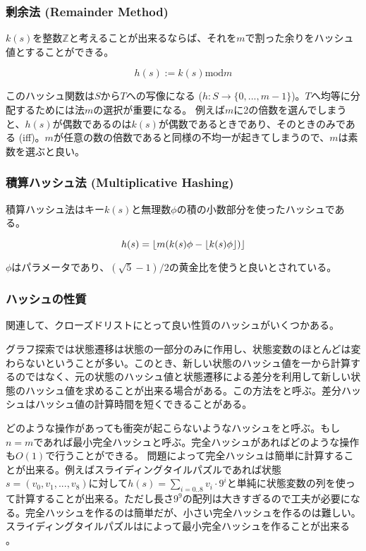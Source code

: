 \subsubsection{剰余法 (Remainder Method)}

$k(s)$を整数$\mathbb{Z}$と考えることが出来るならば、それを$m$で割った余りをハッシュ値とすることができる。

\begin{equation}
  h(s) := k(s) \text{mod} m
\end{equation}
  
このハッシュ関数は$S$から$T$への写像になる ($h: S \rightarrow \{0, ..., m-1\}$)。$T$へ均等に分配するためには法$m$の選択が重要になる。
例えば$m$に2の倍数を選んでしまうと、$h(s)$が偶数であるのは$k(s)$が偶数であるときであり、そのときのみである (iff)。$m$が任意の数の倍数であると同様の不均一が起きてしまうので、$m$は素数を選ぶと良い。


\subsubsection{積算ハッシュ法 (Multiplicative Hashing)}
積算ハッシュ法はキー$k(s)$と無理数$\phi$の積の小数部分を使ったハッシュである。

\begin{equation}
	h(s) = \lfloor m (k(s) \phi - \lfloor k(s) \phi\rfloor)\rfloor
\end{equation}

$\phi$はパラメータであり、$(\sqrt{5} - 1) / 2$の黄金比を使うと良いとされている。

\subsubsection{ハッシュの性質}

関連して、クローズドリストにとって良い性質のハッシュがいくつかある。

グラフ探索では状態遷移は状態の一部分のみに作用し、状態変数のほとんどは変わらないということが多い。このとき、新しい状態のハッシュ値を一から計算するのではなく、元の状態のハッシュ値と状態遷移による差分を利用して新しい状態のハッシュ値を求めることが出来る場合がある。この方法をと呼ぶ。差分ハッシュはハッシュ値の計算時間を短くできることがある。

どのような操作があっても衝突が起こらないようなハッシュをと呼ぶ。もし$n = m$であれば最小完全ハッシュと呼ぶ。完全ハッシュがあればどのような操作も$O(1)$で行うことができる。
問題によって完全ハッシュは簡単に計算することが出来る。例えばスライディングタイルパズルであれば状態$s = (v_0, v_1,...,v_8)$に対して$h(s) = \sum_{i = 0..8} v_i \cdot 9^i$と単純に状態変数の列を使って計算することが出来る。ただし長さ$9^9$の配列は大きすぎるので工夫が必要になる。完全ハッシュを作るのは簡単だが、小さい完全ハッシュを作るのは難しい。スライディングタイルパズルはによって最小完全ハッシュを作ることが出来る \cite{korf2005large}。




